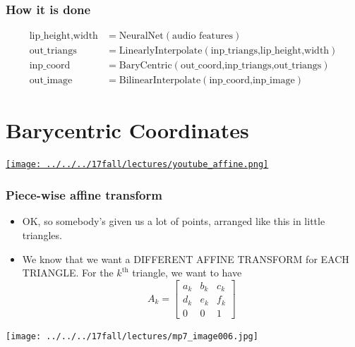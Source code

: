 \documentclass{beamer}
\begin{document}
\begin{frame}
  \frametitle{How it is done}
    \begin{align*}
      \mbox{lip\_height,width} &= \mbox{NeuralNet}\left(\mbox{audio features}\right)\\
      \mbox{out\_triangs} &= \mbox{LinearlyInterpolate}\left(\mbox{inp\_triangs,lip\_height,width}\right)\\
      \mbox{inp\_coord} &= \mbox{BaryCentric}\left(\mbox{out\_coord,inp\_triangs,out\_triangs}\right)\\
      \mbox{out\_image} &= \mbox{BilinearInterpolate}\left(\mbox{inp\_coord,inp\_image}\right)
    \end{align*}
\end{frame}

\section{Barycentric Coordinates}
\setcounter{subsection}{1}

\begin{frame}
  \centerline{\href{https://www.youtube.com/watch?v=il6Z5LCykZk}{\texttt{[image: ../../../17fall/lectures/youtube\_affine.png]}}}
\end{frame}

\begin{frame}
  \frametitle{Piece-wise affine transform}
  \begin{itemize}
    \item OK, so somebody's given us a lot of points, arranged like
      this in little triangles.
    \item We know that we want a DIFFERENT AFFINE TRANSFORM for EACH
      TRIANGLE.  For the $k^{\textrm{th}}$ triangle, we want to have
      \[
      A_k = \left[\begin{array}{ccc}a_k&b_k&c_k\\d_k&e_k&f_k\\0&0&1\end{array}\right]
      \]
  \end{itemize}
  \centerline{\texttt{[image: ../../../17fall/lectures/mp7\_image006.jpg]}}
\end{frame}
\end{document}
